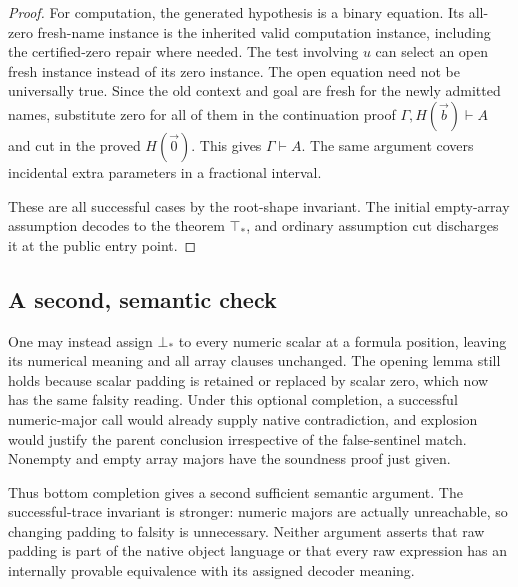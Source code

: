 \begin{proof}
For computation, the generated hypothesis is a binary equation.  Its
all-zero fresh-name instance is the inherited valid computation instance,
including the certified-zero repair where needed.  The test involving
$u$ can select an open fresh instance instead of its zero instance.
The open equation need not be universally true.  Since the old context
and goal are fresh for the newly admitted names, substitute zero for all
of them in the continuation proof $\Gamma,H(\vec b)\vdash A$ and cut
in the proved $H(\vec0)$.  This gives $\Gamma\vdash A$.  The same
argument covers incidental extra parameters in a fractional interval.

These are all successful cases by the root-shape invariant.  The initial
empty-array assumption decodes to the theorem $\top_*$, and ordinary
assumption cut discharges it at the public entry point.
\end{proof}

\subsection{A second, semantic check}

One may instead assign $\bot_*$ to every numeric scalar at a formula
position, leaving its numerical meaning and all array clauses unchanged.
The opening lemma still holds because scalar padding is retained or
replaced by scalar zero, which now has the same falsity reading.  Under
this optional completion, a successful numeric-major call would already
supply native contradiction, and explosion would justify the parent
conclusion irrespective of the false-sentinel match.  Nonempty and empty
array majors have the soundness proof just given.

Thus bottom completion gives a second sufficient semantic argument.
The successful-trace invariant is stronger: numeric majors are actually
unreachable, so changing padding to falsity is unnecessary.  Neither
argument asserts that raw padding is part of the native object language
or that every raw expression has an internally provable equivalence with
its assigned decoder meaning.


